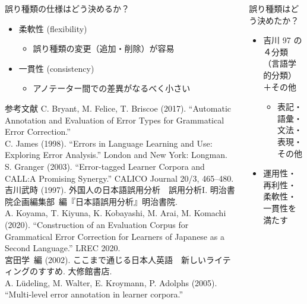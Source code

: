 \documentclass[12pt]{beamer}
\newcommand{\mynum}[2]{%
	{\color{#1}\fontsize{50pt}{0pt}\selectfont\dejavu{\char"#2}\hspace*{-0.35em}}
}
\begin{document}
\begin{frame}
\begin{columns}
\begin{column}{.49\linewidth}
\begin{block}{誤り種類の仕様はどう決めるか？}
\begin{itemize}
\begin{itemize}
							\item[\mynum{orange}{2779}] 柔軟性 (flexibility)
								\begin{itemize}
									\item 誤り種類の変更（追加・削除）が容易
								\end{itemize}
							\item[\mynum{orange}{277A}] 一貫性 (consistency)
								\begin{itemize}
									\item アノテーター間での差異がなるべく小さい
								\end{itemize}
						\end{itemize}
				\end{itemize}
			\end{block}

			\begin{block}{参考文献}
				\small
				C. Bryant, M. Felice, T. Briscoe (2017).
				``Automatic Annotation and Evaluation of Error Types for Grammatical Error Correction.''
				\\
				C. James (1998).
 				``Errors in Language Learning and Use: Exploring Error Analysis.''
				London and New York: Longman.
				\\
				S. Granger (2003).
				``Error-tagged Learner Corpora and CALL:A Promising Synergy.''
				CALICO Journal 20/3, 465–480.
				\\
				吉川武時 (1997). 
				外国人の日本語誤用分析　誤用分析I.
				明治書院企画編集部\ 編『日本語誤用分析』明治書院.
				\\
				A. Koyama, T. Kiyuna, K. Kobayashi, M. Arai, M. Komachi (2020).
				``Construction of an Evaluation Corpus for Grammatical Error Correction for Learners of Japanese as a Second Language.''
				LREC 2020.
				\\
				宮田学\ 編 (2002).
				ここまで通じる日本人英語　新しいライティングのすすめ.
				大修館書店.
				\\
				A. Lüdeling, M. Walter, E. Kroymann, P. Adolphs  (2005).
				``Multi-level error annotation in learner corpora.''
			\end{block}
		\end{column}

		\begin{column}{.49\linewidth}

			\begin{block}{誤り種類はどう決めたか？}
				\begin{itemize}
					\item 吉川 97 の４分類（言語学的分類）＋その他
						\begin{itemize}
							\item 表記・語彙・文法・表現・その他
						\end{itemize}
					\item 運用性・再利性・柔軟性・一貫性を満たす
				\end{itemize}
			\end{block}


\end{column}
\end{columns}
\end{frame}
\end{document}
